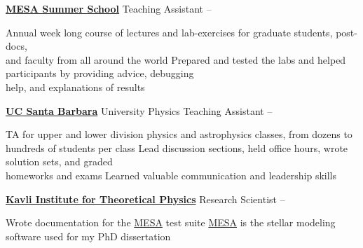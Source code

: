 \documentclass[letterpaper,MMMyyyy,nonstopmode]{simpleresumecv}
\begin{document}
\begin{Body}
\Entry
\href{http://cococubed.asu.edu/mesa_summer_school_2018/}
{\textbf{MESA Summer School}}
\Gap
\BulletItem
Teaching Assistant
\hfill
{} --
\begin{Detail}
\SubBulletItem
Annual week long course of lectures and lab-exercises for graduate students, post-docs, \\
and faculty from all around the world
\SubBulletItem
Prepared and tested the labs and helped participants by providing advice, debugging \\
help, and explanations of results\vspace{2mm}
\end{Detail}

\Entry
\href{https://www.ucsb.edu/}
{\textbf{UC Santa Barbara}}
\Gap
\BulletItem
University Physics Teaching Assistant
\hfill
{} --
\begin{Detail}
\SubBulletItem
TA for upper and lower division physics and astrophysics classes, from dozens to \\
hundreds of students per class
\SubBulletItem
Lead discussion sections, held office hours, wrote solution sets, and graded \\
homeworks and exams
\SubBulletItem
Learned valuable communication and leadership skills\vspace{2mm}
\end{Detail}

\Entry
\href{https://www.kitp.ucsb.edu/}
{\textbf{Kavli Institute for Theoretical Physics}}
\Gap
\BulletItem
Research Scientist
\hfill
{} --
\begin{Detail}
\SubBulletItem
Wrote documentation for the \href{http://mesa.sourceforge.net/}{MESA} test suite
\SubBulletItem
\href{http://mesa.sourceforge.net/}{MESA} is the stellar modeling software used for my PhD dissertation
\end{Detail}







\end{Body}
\end{document}
